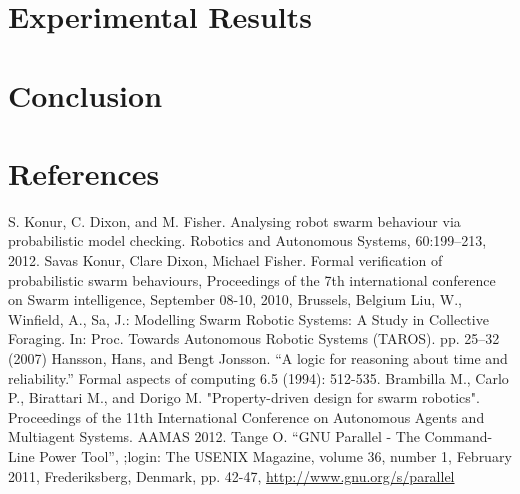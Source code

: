 \documentclass[11pt]{article}
\theoremstyle{definition}
\begin{document}

\section{Experimental Results}
\label{sec:results}

\section{Conclusion}
\label{sec:conclusion}


\section{References}

\begin{thebibliography}{99}
        S. Konur, C. Dixon, and M. Fisher.
        Analysing robot swarm behaviour via probabilistic model checking.
        Robotics and Autonomous Systems, 60:199–213,
        2012.
        Savas Konur, Clare Dixon, Michael Fisher.
        Formal verification of probabilistic swarm behaviours,
        Proceedings of the 7th international conference on Swarm intelligence,
        September 08-10, 2010, Brussels, Belgium
        Liu, W., Winfield, A., Sa, J.:
        Modelling Swarm Robotic Systems: A Study in Collective Foraging.
        In: Proc. Towards Autonomous Robotic Systems (TAROS).
        pp. 25–32 (2007)
        Hansson, Hans, and Bengt Jonsson.
        ``A logic for reasoning about time and reliability.''
        Formal aspects of computing 6.5 (1994): 512-535.
        Brambilla M., Carlo P., Birattari M., and Dorigo M.
        "Property-driven design for swarm robotics".
        Proceedings of the 11th International Conference on
        Autonomous Agents and Multiagent Systems.
        AAMAS 2012.
        Tange O.
        ``GNU Parallel - The Command-Line Power Tool'',
        ;login: The USENIX Magazine,
        volume 36, number 1, February 2011,
        Frederiksberg, Denmark,
        pp. 42-47,
        \url{http://www.gnu.org/s/parallel}
\end{thebibliography}
\end{document}
